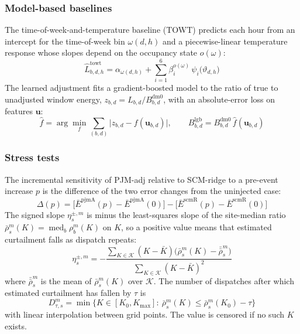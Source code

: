 \subsubsection*{Model-based baselines}
The time-of-week-and-temperature baseline (TOWT) predicts each hour from an intercept for the time-of-week bin $\omega(d,h)$ and a piecewise-linear temperature response whose slopes depend on the occupancy state $o(\omega)$:
\begin{equation}\label{eq:B7}
\hat{L}^{\mathrm{towt}}_{b,d,h}=\alpha_{\omega(d,h)}+\sum_{i=1}^{6}\beta^{o(\omega)}_{i}\,\psi_{i}\bigl(\vartheta_{d,h}\bigr)
\end{equation}
The learned adjustment fits a gradient-boosted model to the ratio of true to unadjusted window energy, $z_{b,d}=L_{b,d}/B^{\mathrm{dm0}}_{b,d}$, with an absolute-error loss on features $\mathbf{u}$:
\begin{equation}\label{eq:B8}
\hat f=\arg\min_{f}\sum_{(b,d)}\bigl\lvert z_{b,d}-f(\mathbf{u}_{b,d})\bigr\rvert,\qquad B^{\mathrm{lgb}}_{b,d}=B^{\mathrm{dm0}}_{b,d}\,\hat f(\mathbf{u}_{b,d})
\end{equation}

\subsubsection*{Stress tests}
The incremental sensitivity of PJM-adj relative to SCM-ridge to a pre-event increase $p$ is the difference of the two error changes from the uninjected case:
\begin{equation}\label{eq:B9}
\Delta(p)=\bigl[\bar{E}^{\mathrm{pjmA}}(p)-\bar{E}^{\mathrm{pjmA}}(0)\bigr]-\bigl[\bar{E}^{\mathrm{scmR}}(p)-\bar{E}^{\mathrm{scmR}}(0)\bigr]
\end{equation}
The signed slope $\eta^{\pm,m}_{s}$ is minus the least-squares slope of the site-median ratio $\bar{\rho}^{m}_{s}(K)=\operatorname{med}_{b}\rho^{m}_{b}(K)$ on $K$, so a positive value means that estimated curtailment falls as dispatch repeats:
\begin{equation}\label{eq:B10}
\eta^{\pm,m}_{s}=-\frac{\sum_{K\in\mathcal{K}}(K-\bar{K})\bigl(\bar{\rho}^{m}_{s}(K)-\bar{\bar{\rho}}^{m}_{s}\bigr)}{\sum_{K\in\mathcal{K}}(K-\bar{K})^{2}}
\end{equation}
where $\bar{\bar{\rho}}^{m}_{s}$ is the mean of $\bar{\rho}^{m}_{s}(K)$ over $\mathcal{K}$. The number of dispatches after which estimated curtailment has fallen by $\tau$ is
\begin{equation}\label{eq:B11}
D^{m}_{\tau,s}=\min\bigl\{K\in[K_{0},K_{\max}]:\ \bar{\rho}^{m}_{s}(K)\le\bar{\rho}^{m}_{s}(K_{0})-\tau\bigr\}
\end{equation}
with linear interpolation between grid points. The value is censored if no such $K$ exists.

